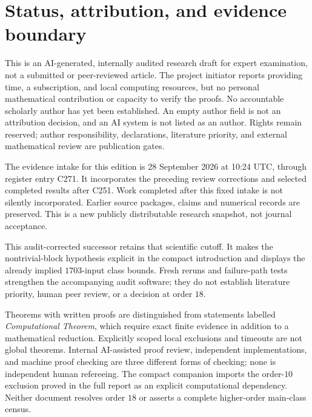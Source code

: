 \section*{Status, attribution, and evidence boundary}
This is an AI-generated, internally audited research draft for expert
examination, not a submitted or peer-reviewed article. The project initiator
reports providing time, a subscription, and local computing resources, but
no personal mathematical contribution or capacity to verify the proofs.
No accountable scholarly author has yet been established. An empty author
field is not an attribution decision, and an AI system is not listed as an
author. Rights remain reserved; author responsibility, declarations,
literature priority, and external mathematical review are publication gates.

The evidence intake for this edition is 28 September 2026 at 10:24 UTC,
through register entry C271. It incorporates the preceding review
corrections and selected completed results after C251. Work completed
after this fixed intake is not silently incorporated. Earlier source
packages, claims and numerical records are preserved. This is a new
publicly distributable research snapshot, not journal acceptance.

This audit-corrected successor retains that scientific cutoff. It makes
the nontrivial-block hypothesis explicit in the compact introduction and
displays the already implied $1703$-input class bounds. Fresh reruns and
failure-path tests strengthen the accompanying audit software; they do not
establish literature priority, human peer review, or a decision at order $18$.

Theorems with written proofs are distinguished from statements labelled
\emph{Computational Theorem}, which require exact finite evidence in
addition to a mathematical reduction. Explicitly scoped local exclusions
and timeouts are not global theorems. Internal AI-assisted proof review,
independent implementations, and machine proof checking are three different
forms of checking; none is independent human refereeing. The compact
companion imports the order-$10$ exclusion proved in the full report as an
explicit computational dependency. Neither document resolves order $18$ or
asserts a complete higher-order main-class census.
